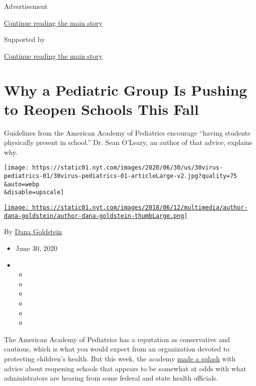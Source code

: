 Advertisement

\protect\hyperlink{after-top}{Continue reading the main story}

Supported by

\protect\hyperlink{after-sponsor}{Continue reading the main story}

\hypertarget{why-a-pediatric-group-is-pushing-to-reopen-schools-this-fall}{%
\section{Why a Pediatric Group Is Pushing to Reopen Schools This
Fall}\label{why-a-pediatric-group-is-pushing-to-reopen-schools-this-fall}}

Guidelines from the American Academy of Pediatrics encourage ``having
students physically present in school.'' Dr. Sean O'Leary, an author of
that advice, explains why.

\texttt{[image: https://static01.nyt.com/images/2020/06/30/us/30virus-pediatrics-01/30virus-pediatrics-01-articleLarge-v2.jpg?quality=75\\\&auto=webp\\\&disable=upscale]}

\href{https://www.nytimes.com/by/dana-goldstein}{\texttt{[image: https://static01.nyt.com/images/2018/06/12/multimedia/author-dana-goldstein/author-dana-goldstein-thumbLarge.png]}}

By \href{https://www.nytimes.com/by/dana-goldstein}{Dana Goldstein}

\begin{itemize}
\item
  June 30, 2020
\item
  \begin{itemize}
  \item
  \item
  \item
  \item
  \item
  \item
  \end{itemize}
\end{itemize}

The American Academy of Pediatrics has a reputation as conservative and
cautious, which is what you would expect from an organization devoted to
protecting children's health. But this week, the academy
\href{https://twitter.com/DanaGoldstein/status/1277566240526123008}{made
a splash} with advice about reopening schools that appears to be
somewhat at odds with what administrators are hearing from some federal
and state health officials.

